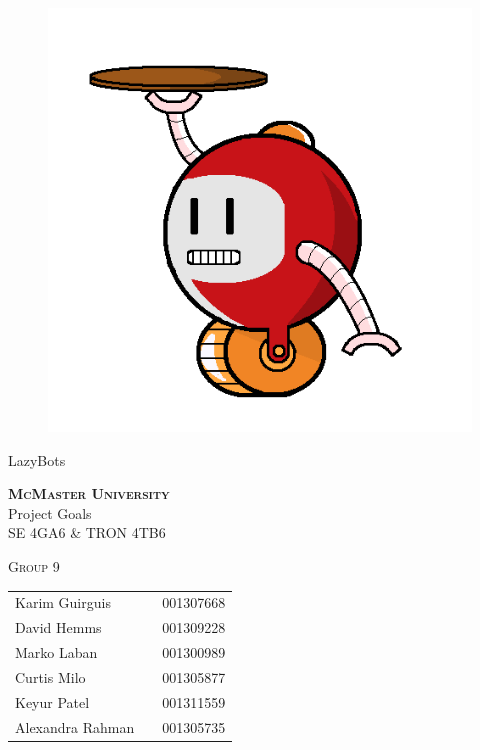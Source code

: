 \documentclass [10pt]{article}
\begin{document}
\begin {center} 

\thispagestyle{empty}
\vspace*{5cm}

\begin {figure}[h!]
\centering
\hspace{-10mm}\includegraphics [scale = .3, trim={.4cm 0 .8cm 0},clip] {figures/alfred.png}
\end {figure}

{\fontfamily{\cabinfamily}\selectfont
\Huge{LazyBots} }

\vspace{1 cm}
{\Large\textbf{\textsc{McMaster University}}\\}  \vspace {1cm}
{\Large Project Goals\\ \vspace {0.4 cm} SE 4GA6 \& TRON 4TB6}  \vspace {1cm}

{\large \textsc{Group 9} \\} \vspace{1cm}

\begin{tabular}{ l c  l}
Karim Guirguis & & 001307668 \\
David Hemms & & 001309228 \\
Marko Laban & & 001300989 \\
Curtis Milo & & 001305877 \\
Keyur Patel & & 001311559 \\
Alexandra Rahman & & 001305735
\end{tabular}

\end{center}
\end{document}
